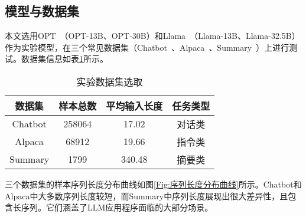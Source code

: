 
\subsection{模型与数据集}

本文选用OPT~\cite{OPT}（OPT-13B、OPT-30B）和Llama~\cite{Llama}（Llama-13B、Llama-32.5B）作为实验模型，在三个常见数据集（Chatbot~\cite{Chatbot}、Alpaca~\cite{Alpaca}、Summary~\cite{Summary}）上进行测试。数据集信息如表\ref{Table:实验数据集选取}所示。

\begin{table}[H]
  \centering
  \caption{实验数据集选取}
  \label{Table:实验数据集选取}
  \renewcommand{\arraystretch}{1.25}
  \small
  \begin{tabular}{c c c c}
    \toprule
    \textbf{数据集} & \textbf{样本总数} & \textbf{平均输入长度} & \textbf{任务类型} \\
    \midrule
    Chatbot & 258064 & 17.02 & 对话类 \\
    Alpaca & 68912 & 19.66 & 指令类 \\
    Summary & 1799 & 340.48 & 摘要类 \\
    \bottomrule
  \end{tabular}
\end{table}

三个数据集的样本序列长度分布曲线如图\ref{Fig:序列长度分布曲线}所示。Chatbot和Alpaca中大多数序列长度较短，而Summary中序列长度展现出很大差异性，且包含长序列。它们涵盖了LLM应用程序面临的大部分场景。


